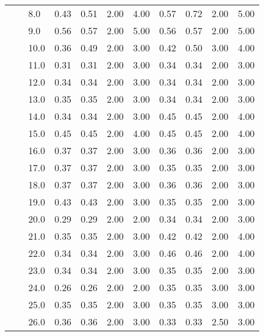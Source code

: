\begin{tabular}{lllrrrrrrrr}
   &     & 8.0  &       0.43 &      0.51 & 2.00 &   4.00 &       0.57 &      0.72 & 2.00 &   5.00 \\
   &     & 9.0  &       0.56 &      0.57 & 2.00 &   5.00 &       0.56 &      0.57 & 2.00 &   5.00 \\
   &     & 10.0 &       0.36 &      0.49 & 2.00 &   3.00 &       0.42 &      0.50 & 3.00 &   4.00 \\
   &     & 11.0 &       0.31 &      0.31 & 2.00 &   3.00 &       0.34 &      0.34 & 2.00 &   3.00 \\
   &     & 12.0 &       0.34 &      0.34 & 2.00 &   3.00 &       0.34 &      0.34 & 2.00 &   3.00 \\
   &     & 13.0 &       0.35 &      0.35 & 2.00 &   3.00 &       0.34 &      0.34 & 2.00 &   3.00 \\
   &     & 14.0 &       0.34 &      0.34 & 2.00 &   3.00 &       0.45 &      0.45 & 2.00 &   4.00 \\
   &     & 15.0 &       0.45 &      0.45 & 2.00 &   4.00 &       0.45 &      0.45 & 2.00 &   4.00 \\
   &     & 16.0 &       0.37 &      0.37 & 2.00 &   3.00 &       0.36 &      0.36 & 2.00 &   3.00 \\
   &     & 17.0 &       0.37 &      0.37 & 2.00 &   3.00 &       0.35 &      0.35 & 2.00 &   3.00 \\
   &     & 18.0 &       0.37 &      0.37 & 2.00 &   3.00 &       0.36 &      0.36 & 2.00 &   3.00 \\
   &     & 19.0 &       0.43 &      0.43 & 2.00 &   3.00 &       0.35 &      0.35 & 2.00 &   3.00 \\
   &     & 20.0 &       0.29 &      0.29 & 2.00 &   2.00 &       0.34 &      0.34 & 2.00 &   3.00 \\
   &     & 21.0 &       0.35 &      0.35 & 2.00 &   3.00 &       0.42 &      0.42 & 2.00 &   4.00 \\
   &     & 22.0 &       0.34 &      0.34 & 2.00 &   3.00 &       0.46 &      0.46 & 2.00 &   4.00 \\
   &     & 23.0 &       0.34 &      0.34 & 2.00 &   3.00 &       0.35 &      0.35 & 2.00 &   3.00 \\
   &     & 24.0 &       0.26 &      0.26 & 2.00 &   2.00 &       0.35 &      0.35 & 3.00 &   3.00 \\
   &     & 25.0 &       0.35 &      0.35 & 2.00 &   3.00 &       0.35 &      0.35 & 3.00 &   3.00 \\
   &     & 26.0 &       0.36 &      0.36 & 2.00 &   3.00 &       0.33 &      0.33 & 2.50 &   3.00 \\

\end{tabular}
